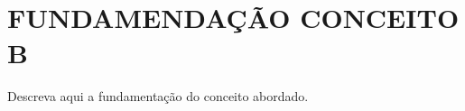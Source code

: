 \section{FUNDAMENDAÇÃO CONCEITO B}
\label{sec:fundamentacao_b}

Descreva aqui a fundamentação do conceito abordado. 